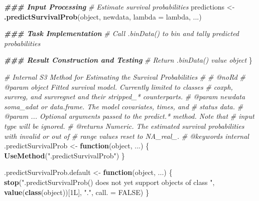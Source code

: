\documentclass[
]{book}
\newenvironment{Shaded}{\begin{snugshade}}{\end{snugshade}}
\newcommand{\AttributeTok}[1]{\textcolor[rgb]{0.13,0.29,0.53}{#1}}
\newcommand{\CommentTok}[1]{\textcolor[rgb]{0.56,0.35,0.01}{\textit{#1}}}
\newcommand{\ConstantTok}[1]{\textcolor[rgb]{0.56,0.35,0.01}{#1}}
\newcommand{\ControlFlowTok}[1]{\textcolor[rgb]{0.13,0.29,0.53}{\textbf{#1}}}
\newcommand{\DocumentationTok}[1]{\textcolor[rgb]{0.56,0.35,0.01}{\textbf{\textit{#1}}}}
\newcommand{\FunctionTok}[1]{\textcolor[rgb]{0.13,0.29,0.53}{\textbf{#1}}}
\newcommand{\NormalTok}[1]{#1}
\newcommand{\OtherTok}[1]{\textcolor[rgb]{0.56,0.35,0.01}{#1}}
\newcommand{\StringTok}[1]{\textcolor[rgb]{0.31,0.60,0.02}{#1}}
\begin{document}
\begin{Shaded}
\begin{Highlighting}[]
  \DocumentationTok{\#\#\# Input Processing}
  \CommentTok{\# Estimate survival probabilities}
\NormalTok{  predictions }\OtherTok{\textless{}{-}} \FunctionTok{.predictSurvivalProb}\NormalTok{(object, newdata, }\AttributeTok{lambda =}\NormalTok{ lambda, ...)}
  
  \DocumentationTok{\#\#\# Task Implementation}
  \CommentTok{\# Call \textasciigrave{}.binData()\textasciigrave{} to bin and tally predicted probabilities}
  
  \DocumentationTok{\#\#\# Result Construction and Testing}
  \CommentTok{\# Return \textasciigrave{}.binData()\textasciigrave{} value object}
\NormalTok{\}}

\CommentTok{\#\textquotesingle{} Internal S3 Method for Estimating the Survival Probabilities}
\CommentTok{\#\textquotesingle{} }
\CommentTok{\#\textquotesingle{} @noRd}
\CommentTok{\#\textquotesingle{} @param object Fitted survival model. Currently limited to classes}
\CommentTok{\#\textquotesingle{}   \textasciigrave{}coxph\textasciigrave{}, \textasciigrave{}survreg\textasciigrave{}, and \textasciigrave{}survregnet\textasciigrave{} and their \textasciigrave{}stripped\_*\textasciigrave{} counterparts.}
\CommentTok{\#\textquotesingle{} @param newdata soma\_adat or data.frame. The model covariates, times, and}
\CommentTok{\#\textquotesingle{}   status data.}
\CommentTok{\#\textquotesingle{} @param ... Optional arguments passed to the \textasciigrave{}predict.*\textasciigrave{} method. Note that}
\CommentTok{\#\textquotesingle{}   input \textasciigrave{}type\textasciigrave{} will be ignored.}
\CommentTok{\#\textquotesingle{} @returns Numeric. The estimated survival probabilities with invalid or out of}
\CommentTok{\#\textquotesingle{}   range values reset to NA\_real\_.}
\CommentTok{\#\textquotesingle{} @keywords internal}
\NormalTok{.predictSurvivalProb }\OtherTok{\textless{}{-}} \ControlFlowTok{function}\NormalTok{(object, ...) \{ }
  \FunctionTok{UseMethod}\NormalTok{(}\StringTok{".predictSurvivalProb"}\NormalTok{) }
\NormalTok{\}}

\NormalTok{.predictSurvivalProb.default }\OtherTok{\textless{}{-}} \ControlFlowTok{function}\NormalTok{(object, ...) \{}
  \FunctionTok{stop}\NormalTok{(}\StringTok{"\textasciigrave{}.predictSurvivalProb()\textasciigrave{} does not yet support objects of class "}\NormalTok{,}
       \FunctionTok{value}\NormalTok{(}\FunctionTok{class}\NormalTok{(object))[1L], }\StringTok{"."}\NormalTok{, }\AttributeTok{call. =} \ConstantTok{FALSE}\NormalTok{)}
\NormalTok{\}}


\end{Highlighting}
\end{Shaded}
\end{document}
